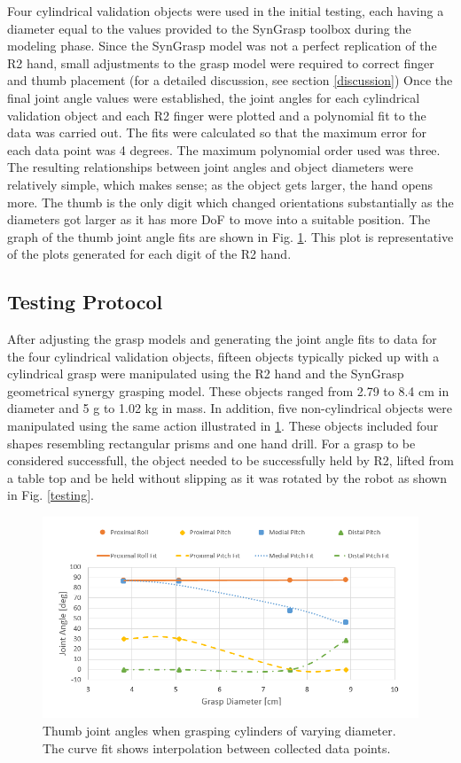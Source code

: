\documentclass[runningheads,a4paper]{llncs}
\begin{document}
Four cylindrical validation objects were used in the initial testing, each having a diameter equal to the values provided to the SynGrasp toolbox during the modeling phase.  Since the SynGrasp model was not a perfect replication of the R2 hand, small adjustments to the grasp model were required to correct finger and thumb placement (for a detailed discussion, see section \ref{discussion}) Once the final joint angle values were established, the joint angles for each cylindrical validation object and each R2 finger were plotted and a polynomial fit to the data was carried out. The fits were calculated so that the maximum error for each data point was 4 degrees.   The maximum polynomial order used was three. The resulting relationships between joint angles and object diameters were relatively simple, which  makes sense; as the object gets larger, the hand opens more. The thumb is the only digit which changed orientations substantially as the diameters got larger as it has more DoF to move into a suitable position. The graph of the thumb joint angle fits are shown in Fig. \ref{thumb_fits}.  This plot is representative of the plots generated for each digit of the R2 hand.

\subsection{Testing Protocol}
After adjusting the grasp models and generating the joint angle fits to data for the four cylindrical validation objects, fifteen objects typically picked up with a cylindrical grasp were manipulated using the R2 hand and the SynGrasp geometrical synergy grasping model.  These objects ranged from 2.79 to 8.4 cm in diameter and 5 g to 1.02 kg in mass. In addition, five non-cylindrical objects were manipulated using the same action illustrated in \ref{thumb_fits}.  These objects included four shapes resembling rectangular prisms and one hand drill.  For a grasp to be considered successfull, the object needed to be successfully held by R2, lifted from a table top and be held without slipping as it was rotated by the robot as shown in Fig. \ref{testing}.

\begin{figure}[!b]
  \centering
  \includegraphics[width=1.08\linewidth]{thumb_fits_3}
  \caption{Thumb joint angles when grasping cylinders of varying diameter.  The curve fit shows interpolation between collected data points.}
  \label{thumb_fits} 
\end{figure}
\end{document}

